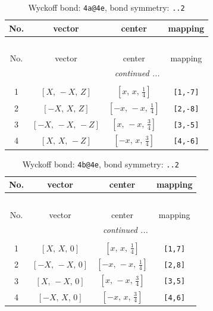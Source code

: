 \documentclass[fleqn,8pt]{jsarticle}
\begin{document}
\begin{longtable}{cccc}
\caption{Wyckoff bond: {\tt 4a@4e}, bond symmetry: {\tt ..2}}
 \\
 \hline \hline
No. & vector & center & mapping \\ \hline \endfirsthead

\multicolumn{3}{l}{\tablename\ \thetable{}} \\
 \hline \hline
No. & vector & center & mapping \\ \hline \endhead

 \hline \hline
\multicolumn{3}{r}{\footnotesize\it continued ...} \\ \endfoot

 \hline \hline
\multicolumn{3}{r}{} \\ \endlastfoot

1 & $\left[ X,\, - X,\, Z \right]$ & $\left[ x,\, x,\, \frac{1}{4} \right]$ & {\tt [1,-7]} \\ \hline
2 & $\left[ - X,\, X,\, Z \right]$ & $\left[ - x,\, - x,\, \frac{1}{4} \right]$ & {\tt [2,-8]} \\ \hline
3 & $\left[ - X,\, - X,\, - Z \right]$ & $\left[ x,\, - x,\, \frac{3}{4} \right]$ & {\tt [3,-5]} \\ \hline
4 & $\left[ X,\, X,\, - Z \right]$ & $\left[ - x,\, x,\, \frac{3}{4} \right]$ & {\tt [4,-6]} \\
\end{longtable}
\renewcommand{\arraystretch}{1.2}
\begin{longtable}{cccc}
\caption{Wyckoff bond: {\tt 4b@4e}, bond symmetry: {\tt ..2}}
 \\
 \hline \hline
No. & vector & center & mapping \\ \hline \endfirsthead

\multicolumn{3}{l}{\tablename\ \thetable{}} \\
 \hline \hline
No. & vector & center & mapping \\ \hline \endhead

 \hline \hline
\multicolumn{3}{r}{\footnotesize\it continued ...} \\ \endfoot

 \hline \hline
\multicolumn{3}{r}{} \\ \endlastfoot

1 & $\left[ X,\, X,\, 0 \right]$ & $\left[ x,\, x,\, \frac{1}{4} \right]$ & {\tt [1,7]} \\ \hline
2 & $\left[ - X,\, - X,\, 0 \right]$ & $\left[ - x,\, - x,\, \frac{1}{4} \right]$ & {\tt [2,8]} \\ \hline
3 & $\left[ X,\, - X,\, 0 \right]$ & $\left[ x,\, - x,\, \frac{3}{4} \right]$ & {\tt [3,5]} \\ \hline
4 & $\left[ - X,\, X,\, 0 \right]$ & $\left[ - x,\, x,\, \frac{3}{4} \right]$ & {\tt [4,6]} \\
\end{longtable}
\end{document}
